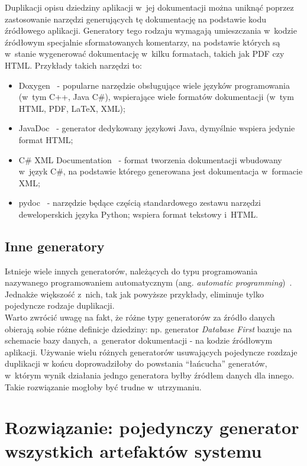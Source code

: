 Duplikacji opisu dziedziny aplikacji w~jej dokumentacji można uniknąć poprzez zastosowanie narzędzi generujących tę dokumentację na podstawie kodu źródłowego aplikacji.
Generatory tego rodzaju wymagają umieszczania w~kodzie źródłowym specjalnie sformatowanych komentarzy, na podstawie których są w~stanie wygenerować dokumentację w~kilku formatach, takich jak PDF czy HTML.
Przykłady takich narzędzi to:

\begin{itemize}
 \item Doxygen~\cite{doxygen} - popularne narzędzie obsługujące wiele języków programowania (w~tym C++, Java C\#), wspierające wiele formatów dokumentacji (w~tym HTML, PDF, LaTeX, XML);
 \item JavaDoc~\cite{javadoc} - generator dedykowany językowi Java, dymyślnie wspiera jedynie format HTML;
 \item C\# XML Documentation~\cite{msdn:xml_doc} - format tworzenia dokumentacji wbudowany w~język C\#, na podstawie którego generowana jest dokumentacja w~formacie XML;
 \item pydoc~\cite{pydoc} - narzędzie będące częścią standardowego zestawu narzędzi deweloperskich języka Python; wspiera format tekstowy i~HTML.
\end{itemize}


\subsection{Inne generatory}

Istnieje wiele innych generatorów, należących do typu programowania nazywanego programowaniem automatycznym (ang. \emph{automatic programming})~\cite{auto_prog}.
Jednakże większość z~nich, tak jak powyższe przykłady, eliminuje tylko pojedyncze rodzaje duplikacji.\\

Warto zwrócić uwagę na fakt, że różne typy generatorów za źródło danych obierają sobie różne definicje dziedziny: np. generator \emph{Database First} bazuje na schemacie bazy danych, a~generator dokumentacji - na kodzie źródłowym aplikacji.
Używanie wielu różnych generatorów usuwających pojedyncze rozdzaje duplikacji w końcu doprowadziłoby do powstania ``łańcucha'' generatów, w~którym wynik działania jedngo generatora byłby źródłem danych dla innego.
Takie rozwiązanie mogłoby być trudne w~utrzymaniu.



\section{Rozwiązanie: pojedynczy generator wszystkich artefaktów systemu}

